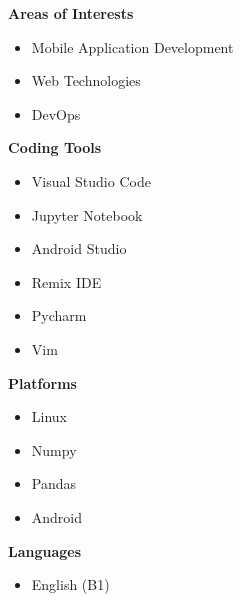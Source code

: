 \documentclass[a4paper,11pt]{article}
\begin{document}
\vspace{0.4em}
\noindent
\begin{minipage}[t]{0.48\textwidth}
    \textbf{Areas of Interests}
    \vspace{0.2em}
    \begin{itemize}[leftmargin=2em]
        \item Mobile Application Development
        \item Web Technologies
        \item DevOps
    \end{itemize}
\end{minipage}%
\hfill
\begin{minipage}[t]{0.48\textwidth}
    \textbf{Coding Tools}
    \vspace{0.2em}
    \begin{itemize}[leftmargin=2em]
        \item Visual Studio Code
        \item Jupyter Notebook
        \item Android Studio
        \item Remix IDE
        \item Pycharm
        \item Vim
    \end{itemize}
\end{minipage}


\vspace{0.4em}
\noindent
\begin{minipage}[t]{0.48\textwidth}
    \textbf{Platforms}
    \vspace{0.2em}
    \begin{itemize}[leftmargin=2em]
        \item Linux
        \item Numpy
        \item Pandas
        \item Android
    \end{itemize}
\end{minipage}%
\hfill
\begin{minipage}[t]{0.48\textwidth}
    \textbf{Languages}
    \vspace{0.2em}
    \begin{itemize}[leftmargin=2em]
        \item English (B1)
    \end{itemize}
\end{minipage}
\end{document}
